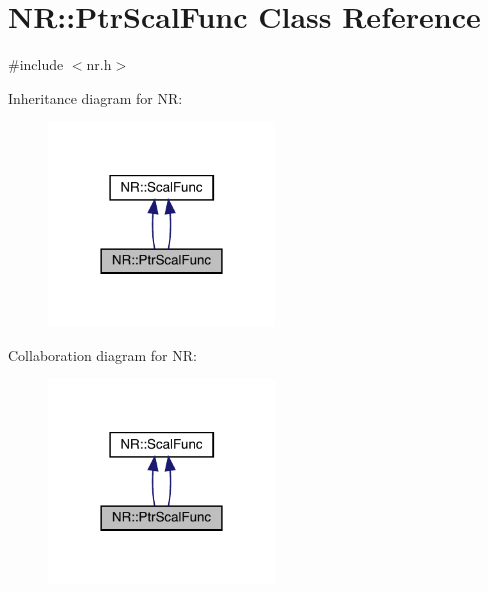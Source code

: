 \hypertarget{classNR_1_1PtrScalFunc}{}\section{NR\+:\+:Ptr\+Scal\+Func Class Reference}
\label{classNR_1_1PtrScalFunc}


{\ttfamily \#include $<$nr.\+h$>$}



Inheritance diagram for NR\+:\nopagebreak
\begin{figure}[H]
\begin{center}
\leavevmode
\includegraphics[width=170pt]{db/d3d/classNR_1_1PtrScalFunc__inherit__graph}
\end{center}
\end{figure}


Collaboration diagram for NR\+:\nopagebreak
\begin{figure}[H]
\begin{center}
\leavevmode
\includegraphics[width=170pt]{d3/db4/classNR_1_1PtrScalFunc__coll__graph}
\end{center}
\end{figure}
